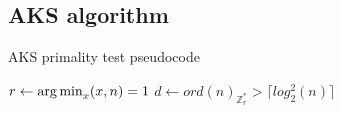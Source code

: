 \subsection{AKS algorithm}
\begin{algorithm}
    \caption{AKS primality test pseudocode}\label{alg:aks_pscd_ptest}
    \label{step_1_aks}
    $r \gets \operatorname*{arg\,min}_{x} (x,n) = 1$\;
    $d \gets ord(n)_{\mathbb{Z}_{r}^{*}} > \lceil log_{2}^{2}(n) \rceil$\;\label{step_2_aks}
    \label{step_3_aks}
    \label{step_4_aks}
    \label{step_5_aks}
    \;\label{step_6_aks}
\end{algorithm}

